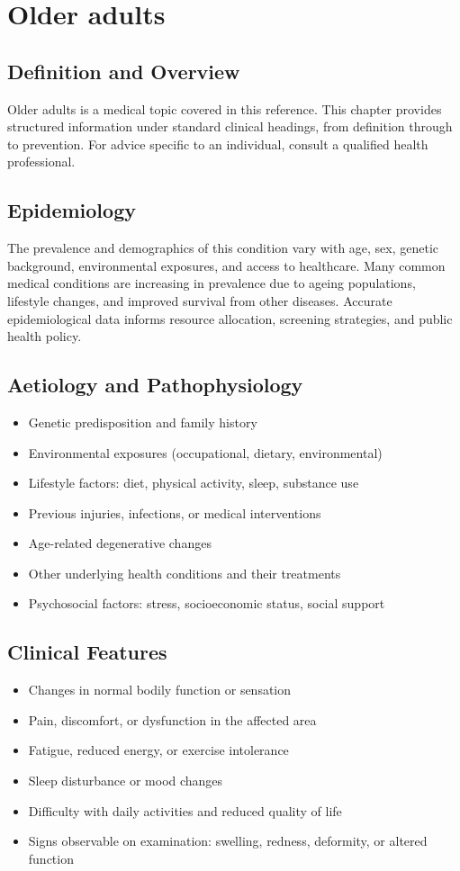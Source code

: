 \chapter{Older adults}

\section*{Definition and Overview}
Older adults is a medical topic covered in this reference. This chapter provides structured information under standard clinical headings, from definition through to prevention. For advice specific to an individual, consult a qualified health professional.

\section*{Epidemiology}
The prevalence and demographics of this condition vary with age, sex, genetic background, environmental exposures, and access to healthcare. Many common medical conditions are increasing in prevalence due to ageing populations, lifestyle changes, and improved survival from other diseases. Accurate epidemiological data informs resource allocation, screening strategies, and public health policy.

\section*{Aetiology and Pathophysiology}
\begin{itemize}
    \item Genetic predisposition and family history
    \item Environmental exposures (occupational, dietary, environmental)
    \item Lifestyle factors: diet, physical activity, sleep, substance use
    \item Previous injuries, infections, or medical interventions
    \item Age-related degenerative changes
    \item Other underlying health conditions and their treatments
    \item Psychosocial factors: stress, socioeconomic status, social support
\end{itemize}

\section*{Clinical Features}
\begin{itemize}
    \item Changes in normal bodily function or sensation
    \item Pain, discomfort, or dysfunction in the affected area
    \item Fatigue, reduced energy, or exercise intolerance
    \item Sleep disturbance or mood changes
    \item Difficulty with daily activities and reduced quality of life
    \item Signs observable on examination: swelling, redness, deformity, or altered function
\end{itemize}

